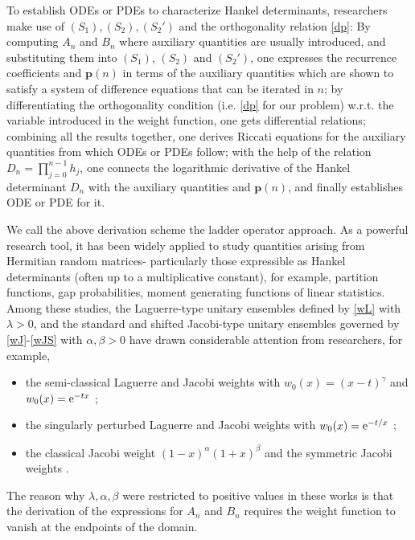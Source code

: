 \documentclass[12pt,a4paper]{article}    %
\numberwithin{equation}{section}
\begin{document}
To establish ODEs or PDEs to characterize Hankel determinants, researchers make use of $(S_1),(S_2), (S_2')$ and the orthogonality relation \eqref{dp}: By computing $A_n$ and $B_n$ where auxiliary quantities are usually introduced, and substituting them into $(S_1)$, $(S_2)$ and $(S_2')$, one expresses the recurrence coefficients and $\textbf{p}(n)$ in terms of the auxiliary quantities which are shown to satisfy a system of difference equations that can be iterated in $n$; by differentiating the orthogonality condition (i.e. \eqref{dp} for our problem) w.r.t. the variable introduced in the weight function, one gets differential relations; combining all the results together, one derives Riccati equations for the auxiliary quantities from which ODEs or PDEs follow; with the help of the relation $D_n=\prod_{j=0}^{n-1}h_j$, one connects the logarithmic derivative of the Hankel determinant $D_n$ with the auxiliary quantities and $\textbf{p}(n)$, and finally establishes ODE or PDE for it.

We call the above derivation scheme the ladder operator approach. As a powerful research tool, it has been widely applied to study quantities arising from Hermitian random matrices- particularly those expressible as Hankel determinants (often up to a multiplicative constant), for example, partition functions, gap probabilities, moment generating functions of linear statistics. Among these studies, the Laguerre-type unitary ensembles defined by \eqref{wL} with $\lambda>0$, and the standard and shifted Jacobi-type unitary ensembles governed by \eqref{wJ}-\eqref{wJS} with $\alpha,\beta>0$ have drawn considerable attention from researchers, for example,
\begin{itemize}
\item [(i)] the semi-classical Laguerre  and Jacobi weights with $w_0(x)=(x-t)^{\gamma}$ \cite{ChenMcKay12,DZ10} and $w_0(x)={\rm e}^{-tx}$ \cite{BCE10};
\item [(ii)] the singularly perturbed Laguerre and Jacobi weights with $w_0(x)={\rm e}^{-t/x}$ \cite{ChenIts2010,CD10};
\item [(iii)] the classical Jacobi weight $(1-x)^{\alpha}(1+x)^{\beta}$ \cite{ChenIsmail05} and the symmetric Jacobi weights \cite{BCH15,MinChen22,MinChenNPB20,MinChen21}.
\end{itemize}
The reason why $\lambda,\alpha,\beta$ were restricted to positive values in these works is that the derivation of the expressions for $A_n$ and $B_n$ requires the weight function to vanish at the endpoints of the domain.
\end{document}
